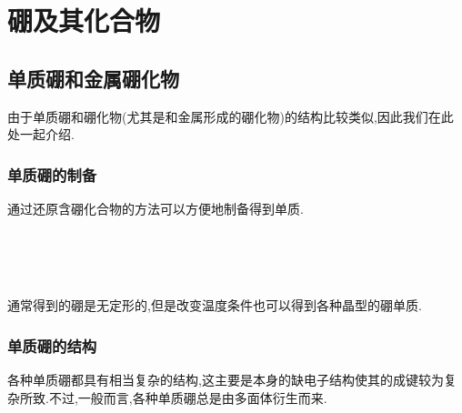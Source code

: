 \documentclass{ctexart}
\begin{document}
\section{硼及其化合物}
\subsection{单质硼和金属硼化物}
由于单质硼和硼化物(尤其是和金属形成的硼化物)的结构比较类似,因此我们在此处一起介绍.
\subsubsection{单质硼的制备}
通过还原含硼化合物的方法可以方便地制备得到单质.
\begin{center}
    \\
    \\
    \\
\end{center}
通常得到的硼是无定形的,但是改变温度条件也可以得到各种晶型的硼单质.
\subsubsection{单质硼的结构}
各种单质硼都具有相当复杂的结构,这主要是本身的缺电子结构使其的成键较为复杂所致.不过,一般而言,各种单质硼总是由多面体衍生而来.
\end{document}
